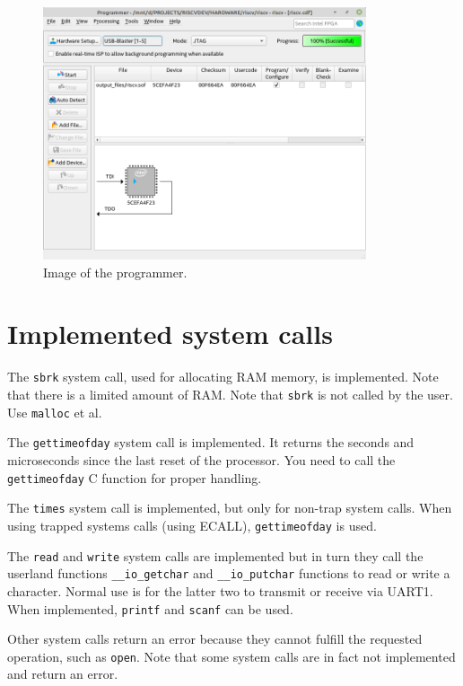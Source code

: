 \documentclass[12pt]{article}
\begin{document}
\begin{itemize}
\begin{figure}[!ht]
\centering
\includegraphics[width=0.85\textwidth]{images/programmer}
\caption{Image of the programmer.}
\label{programmer}
\end{figure}

\end{itemize}

\section{Implemented system calls}
The \lstinline|sbrk| system call, used for allocating RAM memory, is implemented. Note that there is a limited amount of RAM. Note that \lstinline|sbrk| is not called by the user. Use \lstinline|malloc| et al.

The \lstinline|gettimeofday| system call is implemented. It returns the seconds and microseconds since the last reset of the processor. You need to call the \lstinline|gettimeofday| C function for proper handling. %

The \lstinline|times| system call is implemented, but only for non-trap system calls. When using trapped systems calls (using ECALL), \lstinline|gettimeofday| is used.

The \lstinline|read| and \lstinline|write| system calls are implemented but in turn they call the userland functions \lstinline|__io_getchar| and \lstinline|__io_putchar| functions to read or write a character. Normal use is for the latter two to transmit or receive via UART1. When implemented, \lstinline|printf| and \lstinline|scanf| can be used.

Other system calls return an error because they cannot fulfill the requested operation, such as \lstinline|open|. Note that some system calls are in fact not implemented and return an error.
\end{document}

